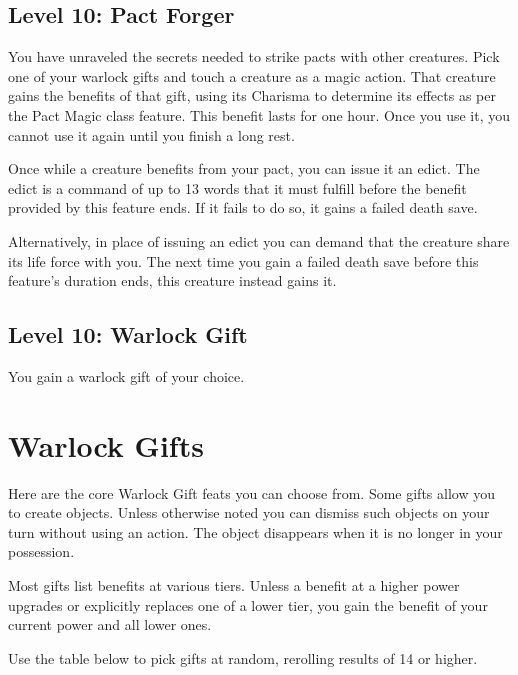 \documentclass[12pt,letterpaper,twocolumn,openany,nodeprecatedcode,bg=none]{dndbook}
\begin{document}
\subsection{Level 10: Pact Forger}\label{level-10-pact-forger}

You have unraveled the secrets needed to strike pacts with other
creatures. Pick one of your warlock gifts and touch a creature as a
magic action. That creature gains the benefits of that gift, using its
Charisma to determine its effects as per the Pact Magic class feature.
This benefit lasts for one hour. Once you use it, you cannot use it
again until you finish a long rest.

Once while a creature benefits from your pact, you can issue it an
edict. The edict is a command of up to 13 words that it must fulfill
before the benefit provided by this feature ends. If it fails to do so,
it gains a failed death save.

Alternatively, in place of issuing an edict you can demand that the
creature share its life force with you. The next time you gain a failed
death save before this feature's duration ends, this creature instead
gains it.

\subsection{Level 10: Warlock Gift}\label{level-10-warlock-gift}

You gain a warlock gift of your choice.

\clearpage

\section{Warlock Gifts}\label{warlock-gifts}

Here are the core Warlock Gift feats you can choose from. Some gifts
allow you to create objects. Unless otherwise noted you can dismiss such
objects on your turn without using an action. The object disappears when
it is no longer in your possession.

Most gifts list benefits at various tiers. Unless a benefit at a higher
power upgrades or explicitly replaces one of a lower tier, you gain the
benefit of your current power and all lower ones.

Use the table below to pick gifts at random, rerolling results of 14 or
higher.
\end{document}
